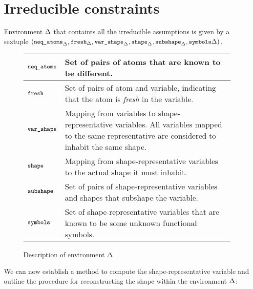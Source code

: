 \documentclass[english, mgr]{iithesis}
\renewcommand{\tt}[1]{\texttt{\small{#1}}}
\renewcommand{\it}[1]{\textit{#1}}
\newcommand{\NeqAtoms}{\tt{neq\_atoms}}
\newcommand{\Fresh}{\tt{fresh}}
\newcommand{\VarShape}{\tt{var\_shape}}
\newcommand{\Shape}{\tt{shape}}
\newcommand{\Subshape}{\tt{subshape}}
\newcommand{\Symbols}{\tt{symbols}}
\begin{document}
\section{Irreducible constraints} \label{sec:solverenv}
Environment $\Delta$ that containts all the irreducible assumptions is given by
a sextuple
$(\NeqAtoms_{\icEnv}
, \Fresh_{\icEnv}
, \VarShape_{\icEnv}
, \Shape_{\icEnv}
, \Subshape_{\icEnv}
, \Symbols{\icEnv}
)$.
\begin{figure}[htpb]
  \begin{tabularx}{\textwidth}{|l|X|}
  \hline
    $\NeqAtoms$ & Set of pairs of atoms that are known to be different. \\
  \hline
    $\Fresh$ & Set of pairs of atom and variable, indicating that the atom is \it{fresh} in the variable. \\
  \hline
    $\VarShape$ & Mapping from variables to shape-representative variables. All variables mapped to the same representative are considered to inhabit the same shape. \\
  \hline
    $\Shape$ & Mapping from shape-representative variables to the actual shape it must inhabit. \\
  \hline
    $\Subshape$ & Set of pairs of shape-representative variables and
    shapes that subshape the variable. \\
  \hline
    $\Symbols$ & Set of shape-representative variables that are known to be some unknown functional symbols. \\
  \hline
  \end{tabularx}
  \caption{Description of environment $\Delta$}
  \label{fig:assumption-equality-rules}
\end{figure}

We can now establish a method to compute the shape-representative variable and
outline the procedure for reconstructing the shape within the environment $\Delta$:\\
\end{document}
